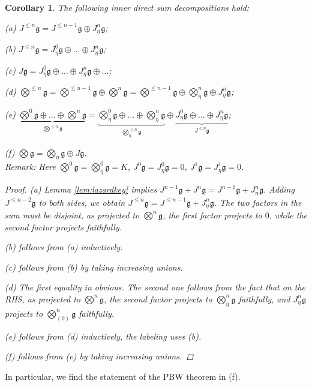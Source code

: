 \documentclass[11pt,a4paper]{amsart}
\newcommand{\plabel}[1]{ \label{#1}}
\newcommand{\plabel}[1]{ \label{#1}\rlap{\smash{${}^{^{[#1]}}$}}}
\newcommand{\plabel}[1]{ \label{#1}}
\newcommand{\botimes}{{\textstyle\bigotimes}}
\theoremstyle{definition}
\theoremstyle{plain}
\newtheorem{cor}[point]{Corollary}
\begin{document}
\begin{cor}\plabel{cor:split}
The following inner direct sum decompositions hold:

(a) $J^{\leq n}\mathfrak g=J^{\leq n-1}\mathfrak g\oplus  J_{\eta}^n\mathfrak g$;

(b) $J^{\leq n}\mathfrak g= J_{\eta}^0\mathfrak g\oplus\ldots\oplus J^{n}_{\eta}\mathfrak g$;

(c) $J\mathfrak g= J_{\eta}^0\mathfrak g\oplus\ldots\oplus J^{n}_{\eta}\mathfrak g\oplus\ldots$;

(d) $\botimes^{\leq n}\mathfrak g=\botimes^{\leq n-1}\mathfrak g\oplus \botimes^{n}\mathfrak g=\botimes^{\leq n-1}\mathfrak g\oplus \botimes^{n}_\eta\mathfrak g\oplus J^n_\eta\mathfrak g$;

(e)
$\underbrace{\botimes^0\mathfrak g \oplus\ldots\oplus\botimes^n\mathfrak g}_{\textstyle{\bigotimes}^{\leq n}\mathfrak g} =
\underbrace{\botimes^0_\eta\mathfrak g \oplus\ldots\oplus\botimes^n_\eta\mathfrak g}_{\textstyle{\bigotimes}^{\leq n}_\eta\mathfrak g} \oplus
\underbrace{   J_{\eta}^0\mathfrak g\oplus\ldots\oplus J^{n}_{\eta}\mathfrak g}_{\textstyle{J^{\leq n}\mathfrak g}}$;

(f) $\textstyle{\bigotimes}\mathfrak g =\textstyle{\bigotimes}_\eta\mathfrak g\oplus J\mathfrak g$.
\\
Remark: Here $\botimes^0\mathfrak g=\botimes^0_\eta\mathfrak g=K$, $J^0\mathfrak g=J^0_\eta\mathfrak g=0$, $J^1\mathfrak g=J^1_\eta\mathfrak g=0$.
\begin{proof}
(a) Lemma \ref{lem:lazardkey} implies $J^{n-1}\mathfrak g+J^{n}\mathfrak g=J^{n-1}\mathfrak g+J_\eta^{n}\mathfrak g$.
Adding $J^{\leq n-2}\mathfrak g$ to both sides, we obtain $J^{\leq n}\mathfrak g =J^{\leq n-1}\mathfrak g+J_\eta^{n}\mathfrak g$.
The two factors in the sum must be disjoint, as projected to $\botimes^n\mathfrak g$,  the first factor projects to $0$, while the
second factor projects faithfully.

(b) follows from (a) inductively.

(c) follows from (b) by taking increasing unions.

(d) The first equality in obvious. The second one follows from the fact that on the RHS,
 as projected to $\botimes^n\mathfrak g$, the second factor projects to $\botimes^{n}_\eta\mathfrak g$ faithfully, and
  $J^n_\eta\mathfrak g$ projects to
$\botimes_{(0)}^n\mathfrak g$ faithfully.

(e) follows from (d) inductively, the labeling uses (b).

(f) follows from (e) by taking increasing unions.
\end{proof}
\end{cor}
In particular, we find the statement of the PBW theorem in (f).
\end{document}
